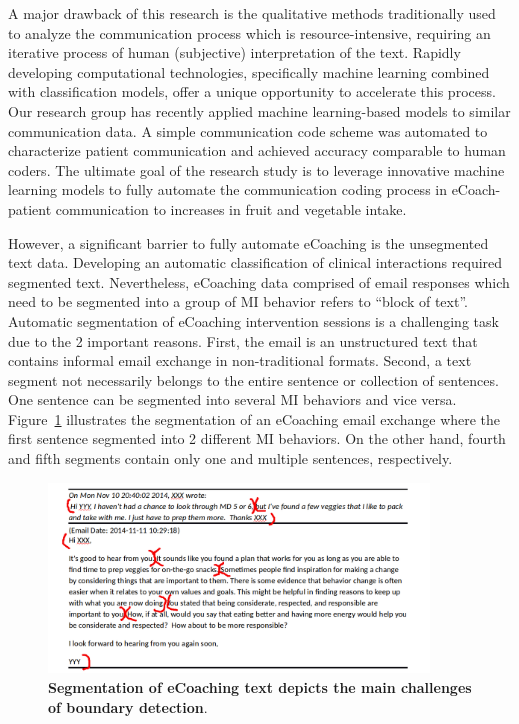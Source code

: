 \documentclass{amia}
\begin{document}
A major drawback of this research is the qualitative methods traditionally used to analyze the communication process which is resource-intensive, requiring an iterative process of human (subjective) interpretation of the text. Rapidly developing computational technologies, specifically machine learning combined with classification models, offer a unique opportunity to accelerate this process. Our research group has recently applied machine learning-based models to similar communication data\cite{hasan2016study,kotov2015interpretable}. A simple communication code scheme was automated to characterize patient communication and achieved accuracy comparable to human coders\cite{hasan2016study}. The ultimate goal of the research study is to leverage innovative machine learning models to fully automate the communication coding process in eCoach-patient communication to increases in fruit and vegetable intake. 

However, a significant barrier to fully automate eCoaching is the unsegmented text data. Developing an automatic classification of clinical interactions required segmented text. Nevertheless, eCoaching data comprised of email responses which need to be segmented into a group of MI behavior refers to ``block of text''. Automatic segmentation of eCoaching intervention sessions is a challenging task due to the 2 important reasons. First, the email is an unstructured text that contains informal email exchange in non-traditional formats. Second, a text segment not necessarily belongs to the entire sentence or collection of sentences. One sentence can be segmented into several MI behaviors and vice versa. Figure~\ref{fig:text-segment} illustrates the segmentation of an eCoaching email exchange where the first sentence segmented into 2 different MI behaviors. On the other hand, fourth and fifth segments contain only one and multiple sentences, respectively.  

\begin{figure}[!htb]
    \centering
    \includegraphics[width=0.9\textwidth]{figures/segment-example.png}
    \caption{\textbf{Segmentation of eCoaching text depicts the main challenges of boundary detection}.}
    \label{fig:text-segment}
\end{figure}
\end{document}
